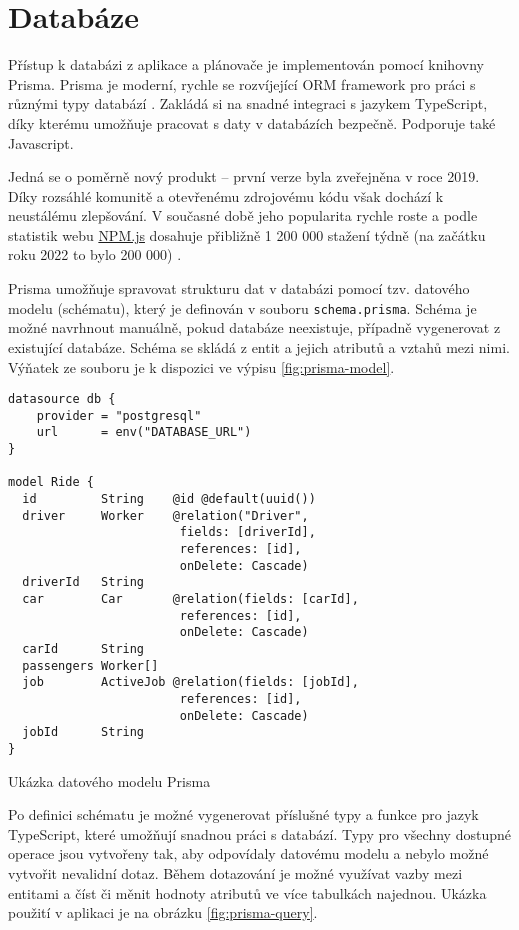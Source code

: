 \section{Databáze}

Přístup k databázi z aplikace a plánovače je implementován pomocí knihovny Prisma. Prisma je moderní, rychle se rozvíjející ORM framework pro práci s různými typy databází \cite{prisma}. 
Zakládá si na snadné integraci s jazykem TypeScript, díky kterému umožňuje pracovat s daty v databázích bezpečně. Podporuje také Javascript.

Jedná se o poměrně nový produkt -- první verze byla zveřejněna v roce 2019. 
Díky rozsáhlé komunitě a otevřenému zdrojovému kódu však dochází k neustálému zlepšování.
V současné době jeho popularita rychle roste a podle statistik webu \href{https://npmjs.com}{NPM.js} dosahuje přibližně 1 200 000 stažení týdně (na začátku roku 2022 to bylo 200 000) \cite{npm_prisma}.

Prisma umožňuje spravovat strukturu dat v databázi pomocí tzv. datového modelu (schématu), který je definován v souboru \texttt{schema.prisma}. 
Schéma je možné navrhnout manuálně, pokud databáze neexistuje, případně vygenerovat z existující databáze. Schéma se skládá z entit a jejich atributů a vztahů mezi nimi.
Výňatek ze souboru je k dispozici ve výpisu \ref{fig:prisma-model}.

\begin{listing}[h]
\begin{verbatim}
datasource db {
    provider = "postgresql"
    url      = env("DATABASE_URL")
}

model Ride {
  id         String    @id @default(uuid())
  driver     Worker    @relation("Driver",
                        fields: [driverId],
                        references: [id],
                        onDelete: Cascade)
  driverId   String
  car        Car       @relation(fields: [carId], 
                        references: [id],
                        onDelete: Cascade)
  carId      String
  passengers Worker[]
  job        ActiveJob @relation(fields: [jobId], 
                        references: [id],
                        onDelete: Cascade)
  jobId      String
}
\end{verbatim}
\caption{Ukázka datového modelu Prisma}
\label{fig:prisma-model}
\end{listing}

Po definici schématu je možné vygenerovat příslušné typy a funkce pro jazyk TypeScript, které umožňují snadnou práci s databází.
Typy pro všechny dostupné operace jsou vytvořeny tak, aby odpovídaly datovému modelu a nebylo možné vytvořit nevalidní dotaz.
Během dotazování je možné využívat vazby mezi entitami a číst či měnit hodnoty atributů ve více tabulkách najednou.
Ukázka použití v aplikaci je na obrázku \ref{fig:prisma-query}.

